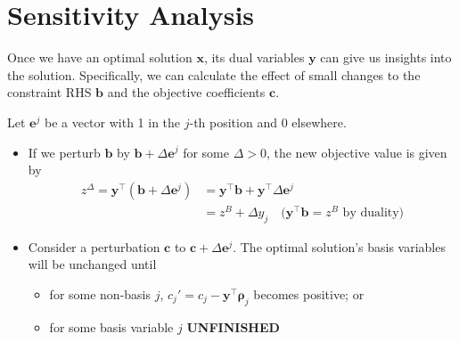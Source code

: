 \documentclass[11pt,a4paper]{article} %
\begin{document}
\section{Sensitivity Analysis}
Once we have an optimal solution $\bm x$, its dual variables $\bm y$ can give us insights 
into the solution. Specifically, we can calculate the effect of small 
changes to the constraint RHS $\bm b$ and the objective coefficients $\bm c$.

Let $\bm e^j$ be a vector with 1 in the $j$-th position and 0 elsewhere. 

\begin{itemize}
    \item If we perturb $\bm b$ by $\bm b + \Delta \bm e^j$ for some $\Delta > 0$, 
    the new objective value is given by 
    \begin{align*}
        z^\Delta = \bm y^\top (\bm b + \Delta \bm e^j) &= \bm y^\top \bm b + \bm y^\top \Delta \bm e^j \\ 
        &= z^B + \Delta y_j \quad \text{($\bm y^\top \bm b = z^B$ by duality)}
    \end{align*}
    \item Consider a perturbation $\bm c$ to $\bm c + \Delta \bm e^j$. The optimal solution's basis variables will be unchanged until
    \begin{itemize}
        \item for some non-basis $j$, $c_j' = c_j - \bm y^\top \bm \rho_j$ becomes positive; or
        \item for some basis variable $j$ \textbf{UNFINISHED}
    \end{itemize}
\end{itemize}
\end{document}
